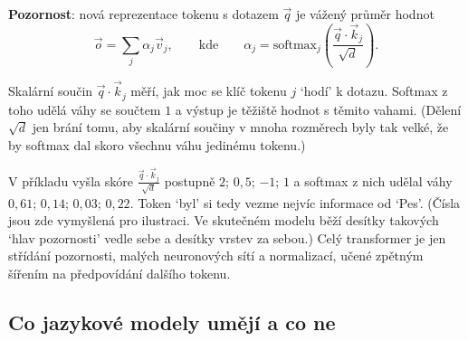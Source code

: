 \begin{definitionbox}
  \textbf{Pozornost}: nová reprezentace tokenu s dotazem $\vec{q}$ je vážený průměr hodnot
  \begin{equation*}
    \vec{o} = \sum_j\alpha_j\vec{v}_j,\qquad\text{kde}\qquad\alpha_j = \mathrm{softmax}_j\left(\frac{\vec{q}\cdot\vec{k}_j}{\sqrt{d}}\right).
  \end{equation*}
\end{definitionbox}

Skalární součin $\vec{q}\cdot\vec{k}_j$ měří, jak moc se klíč tokenu $j$ `hodí' k dotazu. Softmax z toho udělá váhy se součtem $1$ a výstup je těžiště hodnot s těmito vahami. (Dělení $\sqrt{d}$ jen brání tomu, aby skalární součiny v mnoha rozměrech byly tak velké, že by softmax dal skoro všechnu váhu jedinému tokenu.)

\begin{center}
\end{center}

V příkladu vyšla skóre $\frac{\vec{q}\cdot\vec{k}_j}{\sqrt{d}}$ postupně $2$; $0{,}5$; $-1$; $1$ a softmax z nich udělal váhy $0{,}61$; $0{,}14$; $0{,}03$; $0{,}22$. Token `byl' si tedy vezme nejvíc informace od `Pes'. (Čísla jsou zde vymyšlená pro ilustraci. Ve skutečném modelu běží desítky takových `hlav pozornosti' vedle sebe a desítky vrstev za sebou.) Celý transformer je jen střídání pozornosti, malých neuronových sítí a normalizací, učené zpětným šířením na předpovídání dalšího tokenu.

\subsection{Co jazykové modely umějí a co ne}

